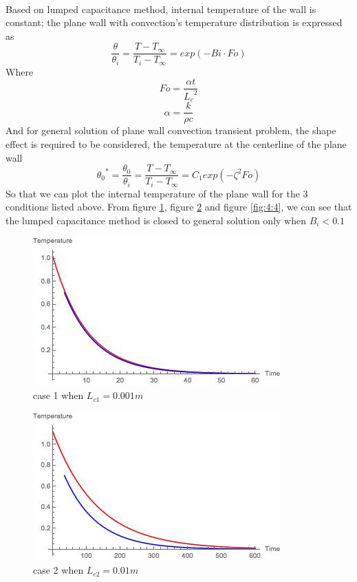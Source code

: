 \begin{solution}
~\\
Based on lumped capacitance method, internal temperature of the wall is constant; the plane wall with convection’s temperature distribution is expressed as
$$\frac{\theta}{\theta_i}=
\frac{T-T_\infty}{T_i-T_\infty}=exp(-Bi\cdot Fo)
$$
Where
$$Fo=\frac{\alpha t}{{L_c}^2}$$
$$\alpha=\frac{k}{\rho c}$$
And for general solution of plane wall convection transient problem, the shape effect is required to be considered, the temperature at the centerline of the plane wall
$${\theta_0}^*=\frac{\theta_0}{\theta_i}
=\frac{T-T_\infty}{T_i-T_\infty}=C_1 exp(-\zeta^2Fo)
$$
So that we can plot the internal temperature of the plane wall for the 3 conditions listed above. From figure \ref{fig:4:2}, figure \ref{fig:4:3} and figure \ref{fig:4:4}, we can see that the lumped capacitance method is closed to general solution only when $B_i<0.1$

\begin{figure}[h!]
  \centering
    \includegraphics[scale=0.8]{figures/ch4/2}
    \caption{case 1 when $L_{c1}=0.001 m$}
    \label{fig:4:2}
\end{figure}

\begin{figure}[h!]
  \centering
    \includegraphics[scale=0.8]{figures/ch4/3}
    \caption{case 2 when $L_{c2}=0.01 m$}
    \label{fig:4:3}
\end{figure}


\end{solution}
